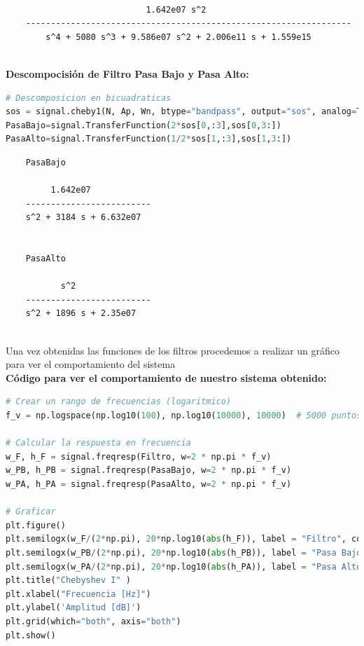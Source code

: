 \begin{verbatim}
	
	                        1.642e07 s^2
	-----------------------------------------------------------------
	    s^4 + 5080 s^3 + 9.586e07 s^2 + 2.006e11 s + 1.559e15
	

\end{verbatim}

\newpage
\textbf{Descompocisión de Filtro Pasa Bajo y Pasa Alto:}

\begin{lstlisting}[language=Python]
# Descomposicion en bicuadraticas
sos = signal.cheby1(N, Ap, Wn, btype="bandpass", output="sos", analog=True)
PasaBajo=signal.TransferFunction(2*sos[0,:3],sos[0,3:])
PasaAlto=signal.TransferFunction(1/2*sos[1,:3],sos[1,3:])
\end{lstlisting}
\begin{verbatim}
	PasaBajo
	
	     1.642e07
	-------------------------
	s^2 + 3184 s + 6.632e07
	
	
	PasaAlto 
	
	       s^2
	-------------------------
	s^2 + 1896 s + 2.35e07
	

\end{verbatim}

\hspace{1mm} Una vez obtenidas las funciones de los filtros procedemos a realizar un gráfico para ver el comportamiento del sistema\\


\textbf{Código para ver el comportamiento de nuestro sistema obtenido:}

\begin{lstlisting}[language=Python]
# Crear un rango de frecuencias (logaritmico)
f_v = np.logspace(np.log10(100), np.log10(10000), 10000)  # 5000 puntos entre 200 y 5000 rad/s

# Calcular la respuesta en frecuencia
w_F, h_F = signal.freqresp(Filtro, w=2 * np.pi * f_v)
w_PB, h_PB = signal.freqresp(PasaBajo, w=2 * np.pi * f_v)
w_PA, h_PA = signal.freqresp(PasaAlto, w=2 * np.pi * f_v)

# Graficar
plt.figure()
plt.semilogx(w_F/(2*np.pi), 20*np.log10(abs(h_F)), label = "Filtro", color = 'b', linewidth = 1.4)
plt.semilogx(w_PB/(2*np.pi), 20*np.log10(abs(h_PB)), label = "Pasa Bajo", color = 'red', linewidth = 0.5)
plt.semilogx(w_PA/(2*np.pi), 20*np.log10(abs(h_PA)), label = "Pasa Alto", color = 'orange', linewidth = 0.5)
plt.title("Chebyshev I" )
plt.xlabel("Frecuencia [Hz]")
plt.ylabel('Amplitud [dB]')
plt.grid(which="both", axis="both")
plt.show()
\end{lstlisting}

